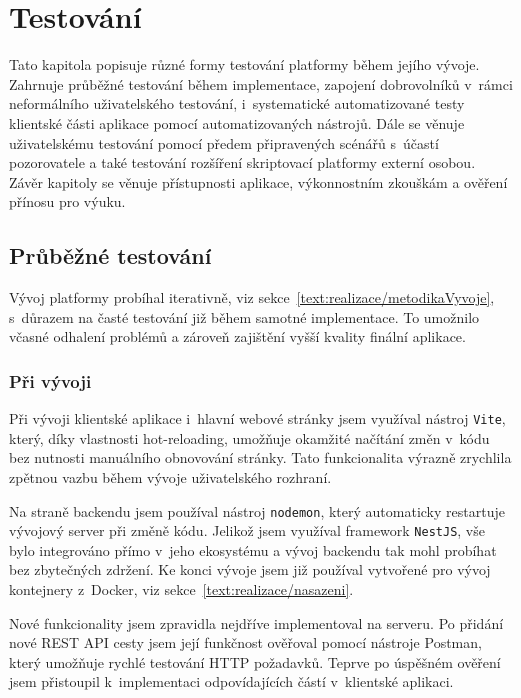\chapter{Testování}\label{text:testovani}

\begin{chapterabstract}
Tato kapitola popisuje různé formy testování platformy během jejího vývoje. 
Zahrnuje průběžné testování během implementace, zapojení dobrovolníků v~rámci neformálního uživatelského testování, i~systematické automatizované testy klientské části aplikace pomocí automatizovaných nástrojů. 
Dále se věnuje uživatelskému testování pomocí předem připravených scénářů s~účastí pozorovatele a také testování rozšíření skriptovací platformy externí osobou. 
Závěr kapitoly se věnuje přístupnosti aplikace, výkonnostním zkouškám a ověření přínosu pro výuku.
\end{chapterabstract}

\section{Průběžné testování}\label{text:testovani/prubezne}

Vývoj platformy probíhal iterativně, viz sekce~\ref{text:realizace/metodikaVyvoje}, s~důrazem na časté testování již během samotné implementace.
To umožnilo včasné odhalení problémů a zároveň zajištění vyšší kvality finální aplikace.

\subsection{Při vývoji}

Při vývoji klientské aplikace i~hlavní webové stránky jsem využíval nástroj \texttt{Vite}, který, díky vlastnosti hot-reloading, umožňuje okamžité načítání změn v~kódu bez nutnosti manuálního obnovování stránky.
Tato funkcionalita výrazně zrychlila zpětnou vazbu během vývoje uživatelského rozhraní.

Na straně backendu jsem používal nástroj \texttt{nodemon}, který automaticky restartuje vývojový server při změně kódu. 
Jelikož jsem využíval framework \texttt{NestJS}, vše bylo integrováno přímo v~jeho ekosystému a vývoj backendu tak mohl probíhat bez zbytečných zdržení.
Ke konci vývoje jsem již používal vytvořené pro vývoj kontejnery z~Docker, viz sekce~\ref{text:realizace/nasazeni}.

Nové funkcionality jsem zpravidla nejdříve implementoval na serveru.
Po přidání nové REST API cesty jsem její funkčnost ověřoval pomocí nástroje Postman, který umožňuje rychlé testování HTTP požadavků.
Teprve po úspěšném ověření jsem přistoupil k~implementaci odpovídajících částí v~klientské aplikaci.

